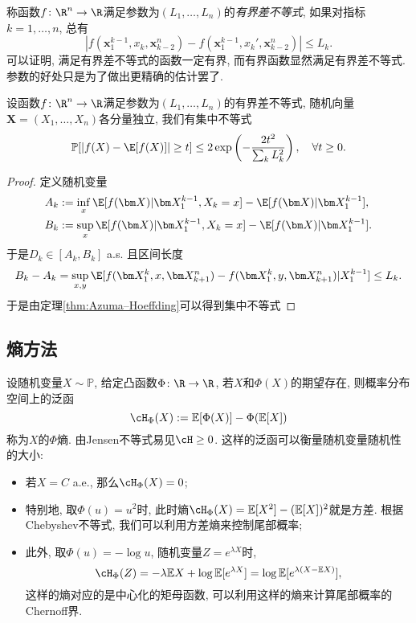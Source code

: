 称函数$f \colon \R^n \to \R$满足参数为$(L_1, \dots, L_n)$的\emph{有界差不等式}, 如果对指标$k = 1, \dots, n$, 总有
\begin{equation*}
	|f(\bm x_1^{k-1}, x_k, \bm x_{k-2}^n) - f(\bm x_1^{k-1}, x_k', \bm x_{k-2}^n)| 
	\leq L_k. 
\end{equation*}
可以证明, 满足有界差不等式的函数一定有界, 而有界函数显然满足有界差不等式. 
参数的好处只是为了做出更精确的估计罢了. 

\begin{corollary}[有界差不等式]
	设函数$f \colon \R^n \to \R$满足参数为$(L_1, \dots, L_n)$的有界差不等式, 随机向量$\bm X = (X_1, \dots, X_n)$各分量独立, 我们有集中不等式
	\begin{equation*}
		\mathbb{P}[|f(X) - \E[f(X)]| \geq t] 
		\leq 2 \exp\left( - \frac{2 t^2}{\sum_k L_k^2} \right), 
		\quad \forall t \geq 0. 
	\end{equation*}
\end{corollary}
\begin{proof}
	定义随机变量 
	\begin{align*}
		A_k &:= \inf_x \E[f(\bm X)|\bm X_1^{k-1}, X_k = x] - \E[f(\bm X)|\bm X_1^{k-1}], \\
		B_k &:= \sup_x \E[f(\bm X)|\bm X_1^{k-1}, X_k = x] - \E[f(\bm X)|\bm X_1^{k-1}]. 
	\end{align*} 
	于是$D_k \in [A_k, B_k]$ a.s. 且区间长度
	\begin{equation*}
		B_k - A_k
		= \sup_{x, y} \E[f(\bm X_1^k, x, \bm X_{k+1}^n) - f(\bm X_1^k, y, \bm X_{k+1}^n) | X_1^{k-1}] 
		\leq L_k. 
	\end{equation*}
	于是由定理\ref{thm:Azuma–Hoeffding}可以得到集中不等式
\end{proof}

\subsection{熵方法}
设随机变量$X \sim \mathbb{P}$, 给定凸函数$\Phi \colon \R \to \R$, 若$X$和$\Phi(X)$的期望存在, 则概率分布空间上的泛函
\begin{equation*}
	\cH_\Phi(X) := \mathbb{E}[\Phi(X)] - \Phi(\mathbb{E}[X])  
\end{equation*}
称为$X$的$\Phi$熵.
由Jensen不等式易见$\cH \geq 0$.
这样的泛函可以衡量随机变量随机性的大小: 
\begin{itemize}
	\item 若$X = C$ a.e., 那么$\cH_\Phi (X) = 0$; 
	\item 特别地, 取$\Phi(u) = u^2$时, 此时熵$\cH_\Phi(X) = \mathbb{E}[X^2] - (\mathbb{E}[X])^2$就是方差. 根据Chebyshev不等式, 我们可以利用方差熵来控制尾部概率; 
	\item 此外, 取$\Phi(u) = - \log u$, 随机变量$Z = e^{\lambda X}$时, 
		\begin{equation*}
			\cH_\Phi(Z) 
			= - \lambda \mathbb{E}X + \log \mathbb{E}[e^{\lambda X}] 
			= \log \mathbb{E}[e^{\lambda(X - \mathbb{E}X)}], 
		\end{equation*}
		这样的熵对应的是中心化的矩母函数, 可以利用这样的熵来计算尾部概率的Chernoff界. 
\end{itemize}

